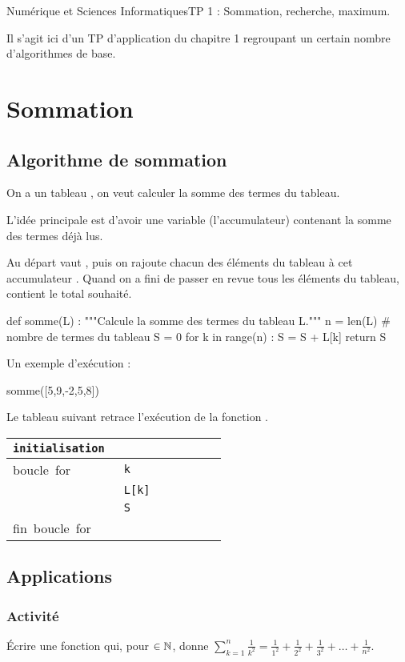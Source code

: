 \documentclass[11pt,a4paper,french,twoside]{PMCours}
\newcounter{activite}
\newcommand{\activite}{\subsubsection*{Activité~\refstepcounter{activite}\theactivite}}
\begin{document}
{Numérique et Sciences Informatiques}{TP 1 : Sommation, recherche, maximum.}

Il s'agit ici d'un TP d'application du chapitre 1 regroupant un certain nombre d'algorithmes de base.

\tableofcontents


\newpage

\section{Sommation}
\subsection{Algorithme de sommation}
On a un tableau , on veut calculer la somme des termes du tableau.

L'idée principale est d'avoir une variable  (l'accumulateur) contenant la
somme des termes déjà lus.

Au départ  vaut , puis on rajoute chacun des éléments du tableau à cet
accumulateur . Quand on a fini de passer en revue tous les éléments du
tableau,  contient le total souhaité.

\begin{Python}
def somme(L) :
    """Calcule la somme des termes du tableau L."""
    n = len(L) # nombre de termes du tableau
    S = 0
    for k in range(n) :
        S = S + L[k]
    return S
\end{Python}

Un exemple d'exécution :
\begin{Python*}
somme([5,9,-2,5,8])
\end{Python*}

Le tableau suivant retrace l'exécution de la fonction .

{\large \begin{tabular} {|l|p{1cm}|p{1cm}|p{1cm}|p{1cm}|p{1cm}|p{1cm}|}\hline
\verb|initialisation |&\multicolumn{6}{l|}{}\\ \hline
\mbox{boucle for}&\verb|k|& & & && \\ \hline
&\verb|L[k]|& & && & \\ \hline
&\verb|S|& & && & \\ \hline
\mbox{fin boucle for}&\multicolumn{6}{l|}{}\\ \hline
 \end{tabular}}
 
\medskip
\subsection{Applications}
\activite
Écrire une fonction  qui, pour $\in\operatorname{\mathbb{N}}$, donne
$\sum_{k=1}^n\frac{1}{k^2}=\frac{1}{1^2}+\frac{1}{2^2}+\frac{1}{3^2}+\ldots
+\frac{1}{n^2}$.
	
\end{document}

